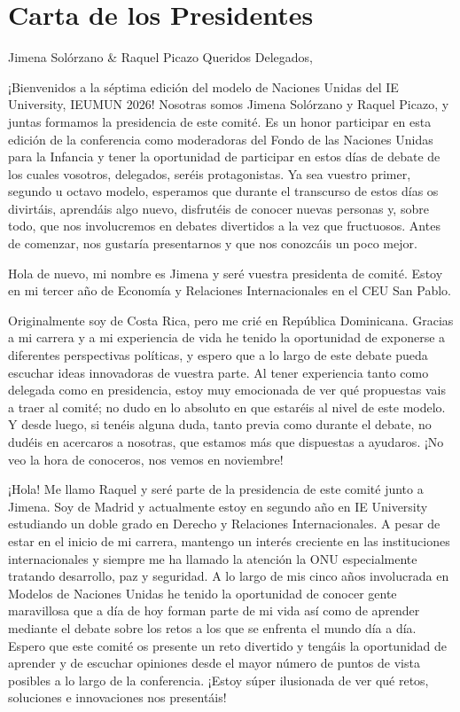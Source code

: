 \section{Carta de los Presidentes}

\begin{chairletter}{Jimena Solórzano \& Raquel Picazo}
Queridos Delegados,

¡Bienvenidos a la séptima edición del modelo de Naciones Unidas del IE University, IEUMUN 2026! Nosotras somos Jimena Solórzano y Raquel Picazo, y juntas formamos la presidencia de este comité. Es un honor participar en esta edición de la conferencia como moderadoras del Fondo de las Naciones Unidas para la Infancia y tener la oportunidad de participar en estos días de debate de los cuales vosotros, delegados, seréis protagonistas. Ya sea vuestro primer, segundo u octavo modelo, esperamos que durante el transcurso de estos días os divirtáis, aprendáis algo nuevo, disfrutéis de conocer nuevas personas y, sobre todo, que nos involucremos en debates divertidos a la vez que fructuosos. Antes de comenzar, nos gustaría presentarnos y que nos conozcáis un poco mejor.

Hola de nuevo, mi nombre es Jimena y seré vuestra presidenta de comité. Estoy en mi tercer año de Economía y Relaciones Internacionales en el CEU San Pablo.

Originalmente soy de Costa Rica, pero me crié en República Dominicana. Gracias a mi carrera y a mi experiencia de vida he tenido la oportunidad de exponerse a diferentes perspectivas políticas, y espero que a lo largo de este debate pueda escuchar ideas innovadoras de vuestra parte. Al tener experiencia tanto como delegada como en presidencia, estoy muy emocionada de ver qué propuestas vais a traer al comité; no dudo en lo absoluto en que estaréis al nivel de este modelo. Y desde luego, si tenéis alguna duda, tanto previa como durante el debate, no dudéis en acercaros a nosotras, que estamos más que dispuestas a ayudaros. ¡No veo la hora de conoceros, nos vemos en noviembre!

¡Hola! Me llamo Raquel y seré parte de la presidencia de este comité junto a Jimena. Soy de Madrid y actualmente estoy en segundo año en IE University estudiando un doble grado en Derecho y Relaciones Internacionales. A pesar de estar en el inicio de mi carrera, mantengo un interés creciente en las instituciones internacionales y siempre me ha llamado la atención la ONU especialmente tratando desarrollo, paz y seguridad. A lo largo de mis cinco años involucrada en Modelos de Naciones Unidas he tenido la oportunidad de conocer gente maravillosa que a día de hoy forman parte de mi vida así como de aprender mediante el debate sobre los retos a los que se enfrenta el mundo día a día. Espero que este comité os presente un reto divertido y tengáis la oportunidad de aprender y de escuchar opiniones desde el mayor número de puntos de vista posibles a lo largo de la conferencia. ¡Estoy súper ilusionada de ver qué retos, soluciones e innovaciones nos presentáis!


\end{chairletter}
